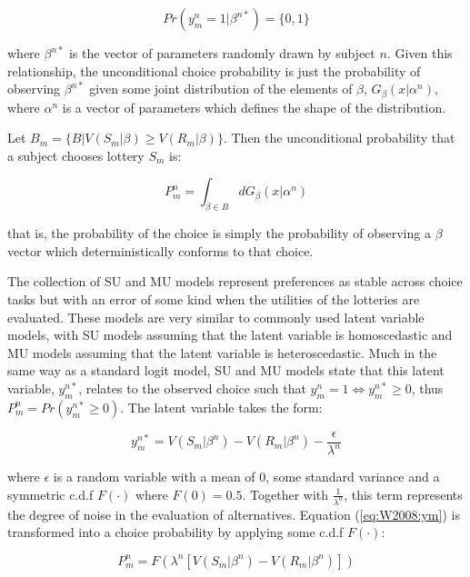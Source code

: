 \documentclass[11pt,a4paper]{report}
\newcommand\Prob{\ensuremath{\mathit{Pr}}}  %
\begin{document}
\begin{equation}
	{\Prob}(y_m^n = 1 | \beta^{n*}) = \lbrace 0,1 \rbrace
\end{equation}

\noindent where $\beta^{n*}$ is the vector of parameters randomly drawn by subject $n$.
Given this relationship, the unconditional choice probability is just the probability of observing $\beta^{n*}$ given some joint distribution of the elements of $\beta$, $G_\beta(x|\alpha^n)$, where $\alpha^n$ is a vector of parameters which defines the shape of the distribution.

\noindent Let $B_m= \lbrace B | V(S_m | \beta) \geq V(R_m|\beta) \rbrace$.
Then the unconditional probability that a subject chooses lottery $S_m$ is:

\begin{equation}
	P_m^n = \int_{\beta \in B} dG_\beta(x | \alpha^n)
\end{equation}

\noindent that is, the probability of the choice is simply the probability of observing a $\beta$ vector which deterministically conforms to that choice.

The collection of SU and MU models represent preferences as stable across choice tasks but with an error of some kind when the utilities of the lotteries are evaluated.
These models are very similar to commonly used latent variable models, with SU models assuming that the latent variable is homoscedastic and MU models assuming that the latent variable is heteroscedastic.
Much in the same way as a standard logit model, SU and MU models state that this latent variable, $y_m^{n*}$, relates to the observed choice such that $y_m^n = 1 \Leftrightarrow y_m^{n*} \geq 0$, thus $P_m^n = {\Prob}(y_m^{n*} \geq 0)$.
The latent variable takes the form:

\begin{equation}
	\label{eq:W2008:ym}
	y_m^{n*} = V(S_m | \beta^n) - V(R_m | \beta^n) - \frac{\epsilon}{\lambda^n}
\end{equation}

\noindent where $\epsilon$ is a random variable with a mean of 0, some standard variance and a symmetric c.d.f $F(\cdot)$ where $F(0) = 0.5$.
Together with $\frac{1}{\lambda^n}$, this term represents the degree of noise in the evaluation of alternatives.
Equation (\ref{eq:W2008:ym}) is transformed into a choice probability by applying some c.d.f $F(\cdot)$:

\begin{equation}
	\label{eq:W2008:Pm}
	P_m^n = F\left( \lambda^n [V(S_m | \beta^n) - V(R_m | \beta^n)] \right)
\end{equation}
\end{document}
